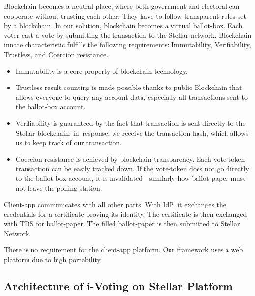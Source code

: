 \documentclass[applsci,article,accept,moreauthors,pdftex]{Definitions/mdpi}
\begin{document}
Blockchain becomes a neutral place, where both government and electoral can cooperate without trusting each other. They have to follow transparent rules set by a blockchain. In our solution, blockchain becomes a virtual ballot-box. Each voter cast a vote by submitting the transaction to the Stellar network. Blockchain innate characteristic fulfills the following requirements: Immutability, Verifiability, Trustless, and Coercion resistance. 
\begin{itemize}
\item Immutability is a core property of blockchain technology. 

\item Trustless result counting is made possible thanks to public Blockchain that allows everyone to query any account data, especially all transactions sent to the ballot-box account. 

\item Verifiability is guaranteed by the fact that transaction is sent {directly} to the Stellar blockchain; in~response, we receive the transaction hash, which allows us to keep track of our transaction. 

\item Coercion resistance is achieved by blockchain transparency. Each vote-token transaction can be easily tracked down. If the vote-token does not go directly to the ballot-box account, it is invalidated––similarly how ballot-paper must not leave the polling station.

\end{itemize}

Client-app communicates with all other parts. With IdP, it exchanges the credentials for a certificate proving its identity. The certificate is then exchanged with TDS for ballot-paper. The filled ballot-paper is then submitted to Stellar Network. 

There is no requirement for the client-app platform. Our framework uses a web platform due to high portability.


\subsection{Architecture of i-Voting on Stellar Platform}
\end{document}
